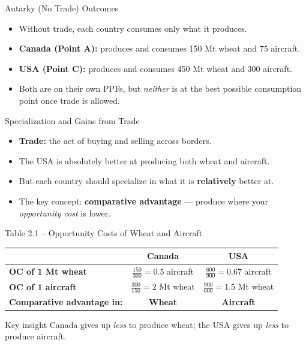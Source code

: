 \documentclass[aspectratio=169]{beamer}
\begin{document}
\begin{frame}{Autarky (No Trade) Outcomes}
\transfade
\begin{itemize}[<+->]
  \item Without trade, each country consumes only what it produces.
  \item \textbf{Canada (Point A):} produces and consumes 150 Mt wheat and 75 aircraft.
  \item \textbf{USA (Point C):} produces and consumes 450 Mt wheat and 300 aircraft.
  \item Both are on their own PPFs, but \emph{neither} is at the best possible consumption point once trade is allowed.
\end{itemize}
\end{frame}

\begin{frame}{Specialization and Gains from Trade}
\transfade
\begin{itemize}[<+->]
  \item \textbf{Trade:} the act of buying and selling across borders.
  \item The USA is absolutely better at producing both wheat and aircraft.
  \item But each country should specialize in what it is \textbf{relatively} better at.
  \item The key concept: \textbf{comparative advantage} --- produce where your \emph{opportunity cost} is lower.
\end{itemize}
\end{frame}

\begin{frame}{Table 2.1 -- Opportunity Costs of Wheat and Aircraft}
\begin{center}
\renewcommand{\arraystretch}{1.6}
\begin{tabular}{lcc}
\toprule
 & \textbf{\color{accent}Canada} & \textbf{\color{canadared}USA} \\
\midrule
\textbf{OC of 1 Mt wheat} & $\tfrac{150}{300}=0.5$ aircraft & $\tfrac{600}{900}=0.67$ aircraft \\
\textbf{OC of 1 aircraft} & $\tfrac{300}{150}=2$ Mt wheat & $\tfrac{900}{600}=1.5$ Mt wheat \\
\midrule
\textbf{Comparative advantage in:} & \textcolor{ppfblue}{\textbf{Wheat}} & \textcolor{canadared}{\textbf{Aircraft}} \\
\bottomrule
\end{tabular}
\end{center}
\vspace{0.5em}
\begin{block}{Key insight}
Canada gives up \emph{less} to produce wheat; the USA gives up \emph{less} to produce aircraft.
\end{block}
\end{frame}
\end{document}
